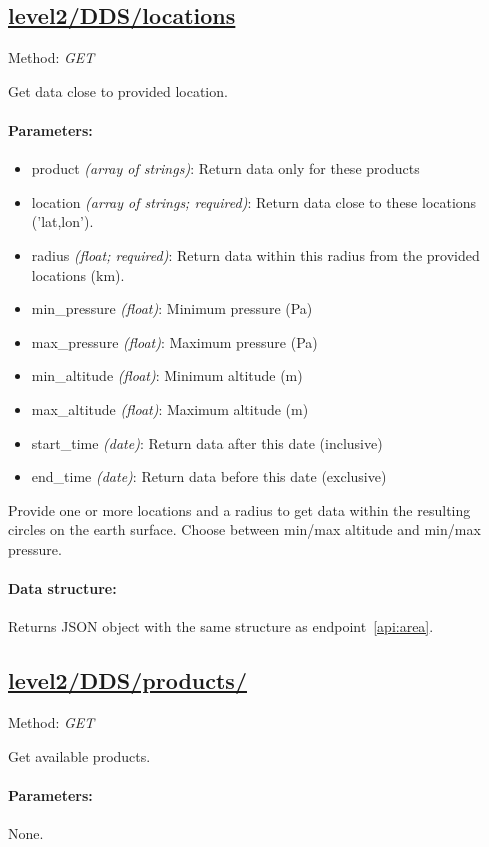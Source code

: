 \subsection{\url{level2/DDS/locations}}
Method: \emph{GET}

Get data close to provided location.

\paragraph{Parameters:}
\begin{itemize}
    \item product \emph{(array of strings)}: Return data only for these
        products
	\item location \emph{(array of strings; required)}: Return data close to
		these locations ('lat,lon').
	\item radius \emph{(float; required)}: Return data within this radius from
		the provided locations (km).
    \item min\_pressure \emph{(float)}: Minimum pressure (Pa)
    \item max\_pressure \emph{(float)}: Maximum pressure (Pa)
    \item min\_altitude \emph{(float)}: Minimum altitude (m)
    \item max\_altitude \emph{(float)}: Maximum altitude (m)
    \item start\_time \emph{(date)}: Return data after this date (inclusive)
    \item end\_time \emph{(date)}: Return data before this date (exclusive)
\end{itemize}

Provide one or more locations and a radius to get data within the resulting
circles on the earth surface. Choose between min/max altitude and min/max
pressure.

\paragraph{Data structure:}
Returns JSON object with the same structure as endpoint~\ref{api:area}.


\subsection{\url{level2/DDS/products/}}
\label{api:products}
Method: \emph{GET}

Get available products.

\paragraph{Parameters:} None.

